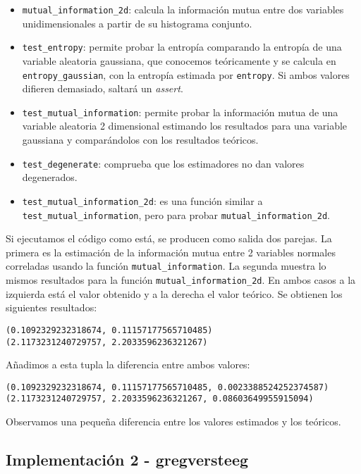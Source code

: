 \documentclass[12pt,a4paper]{report} %
\theoremstyle{definition}
\begin{document}
\begin{itemize}
\item \texttt{mutual\_information\_2d}: calcula la información mutua entre dos variables unidimensionales a partir de su histograma conjunto. 

\item \texttt{test\_entropy}: permite probar la entropía comparando la entropía de una variable aleatoria gaussiana, que conocemos teóricamente y se calcula en \texttt{entropy\_gaussian}, con la entropía estimada por \texttt{entropy}. Si ambos valores difieren demasiado, saltará un \textit{assert}.

\item \texttt{test\_mutual\_information}: permite probar la información mutua de una variable aleatoria 2 dimensional estimando los resultados para una variable gaussiana y comparándolos con los resultados teóricos.

\item \texttt{test\_degenerate}: comprueba que los estimadores no dan valores degenerados.

\item \texttt{test\_mutual\_information\_2d}: es una función similar a \texttt{test\_mutual\_information}, pero para probar \texttt{mutual\_information\_2d}.
\end{itemize} 

Si ejecutamos el código como está, se producen como salida dos parejas. La primera es la estimación de la información mutua entre 2 variables normales correladas usando la función \texttt{mutual\_information}. La segunda muestra lo mismos resultados para la función \texttt{mutual\_information\_2d}. En ambos casos a la izquierda está el valor obtenido y a la derecha el valor teórico. Se obtienen los siguientes resultados:
\begin{lstlisting}
(0.1092329232318674, 0.11157177565710485)
(2.1173231240729757, 2.2033596236321267)
\end{lstlisting}

Añadimos a esta tupla la diferencia entre ambos valores:
\begin{lstlisting}
(0.1092329232318674, 0.11157177565710485, 0.0023388524252374587)
(2.1173231240729757, 2.2033596236321267, 0.08603649955915094)
\end{lstlisting}

Observamos una pequeña diferencia entre los valores estimados y los teóricos.

\subsection{Implementación 2 -  gregversteeg}
\end{document}
